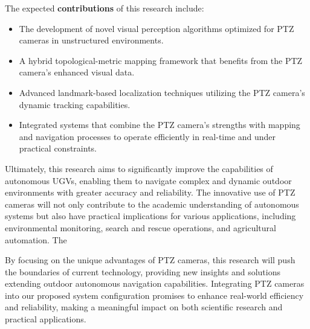 \documentclass[runningheads]{llncs}
\begin{document}
The expected \textbf{contributions} of this research include:

\begin{itemize}
\item The development of novel visual perception algorithms optimized for PTZ cameras in unstructured environments.
\item A hybrid topological-metric mapping framework that benefits from the PTZ camera's enhanced visual data.
\item Advanced landmark-based localization techniques utilizing the PTZ camera's dynamic tracking capabilities.
\item Integrated systems that combine the PTZ camera's strengths with mapping and navigation processes to operate efficiently in real-time and under practical constraints.
\end{itemize}

Ultimately, this research aims to significantly improve the capabilities of autonomous UGVs, enabling them to navigate complex and dynamic outdoor environments with greater accuracy and reliability. The innovative use of PTZ cameras will not only contribute to the academic understanding of autonomous systems but also have practical implications for various applications, including environmental monitoring, search and rescue operations, and agricultural automation. The

By focusing on the unique advantages of PTZ cameras, this research will push the boundaries of current technology, providing new insights and solutions extending outdoor autonomous navigation capabilities. Integrating PTZ cameras into our proposed system configuration promises to enhance real-world efficiency and reliability, making a meaningful impact on both scientific research and practical applications.






\end{document}
